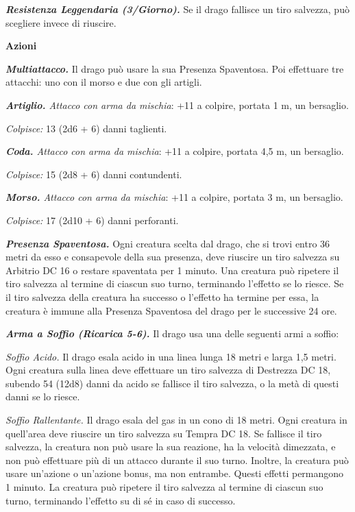 \begin{multicols}{2}
\emph{\textbf{Resistenza Leggendaria (3/Giorno).}} Se il drago fallisce
un tiro salvezza, può scegliere invece di riuscire.

\smallskip\textbf{Azioni}

\emph{\textbf{Multiattacco.}} Il drago può usare la sua Presenza
Spaventosa. Poi effettuare tre attacchi: uno con il morso e due con gli
artigli.

\emph{\textbf{Artiglio.} Attacco con arma da mischia}: +11 a colpire,
portata 1 m, un bersaglio.

\emph{Colpisce:} 13 (2d6 + 6) danni taglienti.

\emph{\textbf{Coda.} Attacco con arma da mischia}: +11 a colpire,
portata 4,5 m, un bersaglio.

\emph{Colpisce:} 15 (2d8 + 6) danni contundenti.

\emph{\textbf{Morso.} Attacco con arma da mischia}: +11 a colpire,
portata 3 m, un bersaglio.

\emph{Colpisce:} 17 (2d10 + 6) danni perforanti.

\emph{\textbf{Presenza Spaventosa.}} Ogni creatura scelta dal drago, che
si trovi entro 36 metri da esso e consapevole della sua presenza, deve
riuscire un tiro salvezza su Arbitrio DC 16 o restare spaventata per 1
minuto. Una creatura può ripetere il tiro salvezza al termine di ciascun
suo turno, terminando l'effetto se lo riesce. Se il tiro salvezza della
creatura ha successo o l'effetto ha termine per essa, la creatura è
immune alla Presenza Spaventosa del drago per le successive 24 ore.

\emph{\textbf{Arma a Soffio (Ricarica 5-6).}} Il drago usa una delle
seguenti armi a soffio:

\emph{Soffio Acido.} Il drago esala acido in una linea lunga 18 metri e
larga 1,5 metri. Ogni creatura sulla linea deve effettuare un tiro
salvezza di Destrezza DC 18, subendo 54 (12d8) danni da acido se
fallisce il tiro salvezza, o la metà di questi danni se lo riesce.

\emph{Soffio Rallentante.} Il drago esala del gas in un cono di 18
metri. Ogni creatura in quell'area deve riuscire un tiro salvezza su Tempra DC 18. Se fallisce il tiro salvezza, la creatura non può
usare la sua reazione, ha la velocità dimezzata, e non può effettuare
più di un attacco durante il suo turno. Inoltre, la creatura può usare
un'azione o un'azione bonus, ma non entrambe. Questi effetti permangono
1 minuto. La creatura può ripetere il tiro salvezza al termine di
ciascun suo turno, terminando l'effetto su di sé in caso di successo.


\end{multicols}
